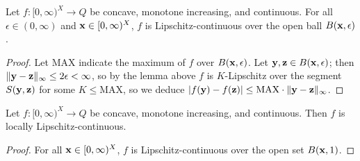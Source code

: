 \begin{proposition}
Let $f: [0,\infty)^{X}\to Q$ be concave, monotone increasing, and continuous.  
For all $\epsilon \in (0,\infty)$ and $\mathbf{x}\in [0,\infty)^{X}$, $f$ is Lipschitz-continuous over the open ball $B(\mathbf{x}, \epsilon)$.
\end{proposition}
\begin{proof}
Let $\mathrm{MAX}$ indicate the maximum of $f$ over $B(\mathbf{x}, \epsilon)$. 
Let $\mathbf{y}, \mathbf{z}\in B(\mathbf{x}, \epsilon)$; then $\|\mathbf{y}-\mathbf{z}\|_{\infty}\leq 2\epsilon < \infty$, so by the lemma above $f$ is $K$-Lipschitz over the segment $S(\mathbf{y}, \mathbf{z})$ for some $K\leq \mathrm{MAX}$, so we deduce $|f(\mathbf{y})-f(\mathbf{z})|\leq \mathrm{MAX}\cdot \|\mathbf{y}-\mathbf{z}\|_{\infty}$.
\end{proof}

\begin{theorem}
Let $f: [0,\infty)^{X}\to Q$ be concave, monotone increasing, and continuous.  
Then $f$ is locally Lipschitz-continuous.
\end{theorem}
\begin{proof}
For all $\mathbf{x}\in [0,\infty)^{X}$, $f$ is Lipschitz-continuous over the open set $B(\mathbf{x}, 1)$.
\end{proof}
